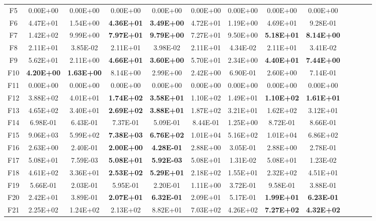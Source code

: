 \begin{table*}[!ht]
\begin{tabular}{|c|cc|cc|cc|cc|cc|cc|}
    F5    & 0.00E+00 & 0.00E+00 & 0.00E+00 & 0.00E+00 & 0.00E+00 & 0.00E+00 & 0.00E+00 & 0.00E+00 \\
   \cline{1-9}
    F6    & 4.47E+01 & 1.54E+00 & \textbf{4.36E+01} & \textbf{3.49E+00} & 4.72E+01 & 1.19E+00 & 4.69E+01 & 9.28E-01 \\
    F7    & 1.42E+02 & 9.99E+00 & \textbf{7.97E+01} & \textbf{9.79E+00} & 7.27E+01 & 9.50E+00 & \textbf{5.18E+01} & \textbf{8.14E+00} \\
    F8    & 2.11E+01 & 3.85E-02 & 2.11E+01 & 3.98E-02 & 2.11E+01 & 4.34E-02 & 2.11E+01 & 3.41E-02 \\
    F9    & 5.62E+01 & 2.11E+00 & \textbf{4.66E+01} & \textbf{3.60E+00} & 5.70E+01 & 2.34E+00 & \textbf{4.40E+01} & \textbf{7.44E+00} \\
    F10   & \textbf{4.20E+00} & \textbf{1.63E+00} & 8.14E+00 & 2.99E+00 & 2.42E+00 & 6.90E-01 & 2.60E+00 & 7.14E-01 \\
    F11   & 0.00E+00 & 0.00E+00 & 0.00E+00 & 0.00E+00 & 0.00E+00 & 0.00E+00 & 0.00E+00 & 0.00E+00 \\
    F12   & 3.88E+02 & 4.01E+01 & \textbf{1.74E+02} & \textbf{3.58E+01} & 1.10E+02 & 1.49E+01 & \textbf{1.10E+02} & \textbf{1.61E+01} \\
    F13   & 4.65E+02 & 3.40E+01 & \textbf{2.69E+02} & \textbf{3.88E+01} & 1.87E+02 & 3.21E+01 & 1.62E+02 & 3.12E+01 \\
    F14   & 6.98E-01 & 6.43E-01 & 7.37E-01 & 5.09E-01 & 8.44E-01 & 1.25E+00 & 8.72E-01 & 8.66E-01 \\
    F15   & 9.06E+03 & 5.99E+02 & \textbf{7.38E+03} & \textbf{6.76E+02} & 1.01E+04 & 5.16E+02 & 1.01E+04 & 6.86E+02 \\
    F16   & 2.63E+00 & 2.40E-01 & \textbf{2.00E+00} & \textbf{4.28E-01} & 2.88E+00 & 3.05E-01 & 2.88E+00 & 2.78E-01 \\
    F17   & 5.08E+01 & 7.59E-03 & \textbf{5.08E+01} & \textbf{5.92E-03} & 5.08E+01 & 1.31E-02 & 5.08E+01 & 1.23E-02 \\
    F18   & 4.61E+02 & 3.36E+01 & \textbf{2.53E+02} & \textbf{5.29E+01} & 2.18E+02 & 1.55E+01 & 2.32E+02 & 4.51E+01 \\
    F19   & 5.66E-01 & 2.03E-01 & 5.95E-01 & 2.20E-01 & 1.11E+00 & 3.72E-01 & 9.58E-01 & 3.88E-01 \\
    F20   & 2.42E+01 & 3.89E-01 & \textbf{2.07E+01} & \textbf{6.32E-01} & 2.09E+01 & 5.17E-01 & \textbf{1.99E+01} & \textbf{6.23E-01} \\
    \cline{1-9}
    F21   & 2.25E+02 & 1.24E+02 & 2.13E+02 & 8.82E+01 & 7.03E+02 & 4.26E+02 & \textbf{7.27E+02} & \textbf{4.32E+02} \\

\end{tabular}
\end{table*}
